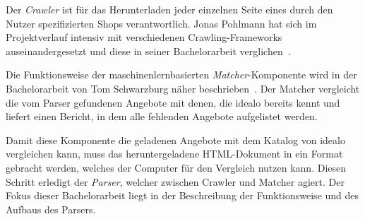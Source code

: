 Der \textit{Crawler} ist für das Herunterladen jeder einzelnen Seite eines durch den Nutzer spezifizierten Shops
verantwortlich.
Jonas Pohlmann hat sich im Projektverlauf intensiv mit verschiedenen Crawling-Frameworks auseinandergesetzt und diese
in seiner Bachelorarbeit verglichen~\cite{thesis:jonas}.

Die Funktionsweise der maschinenlernbasierten \textit{Matcher}-Komponente wird in der Bachelorarbeit von Tom
Schwarzburg näher beschrieben~\cite{thesis:tom}.
Der Matcher vergleicht die vom Parser gefundenen Angebote mit denen, die idealo bereits kennt und liefert
einen Bericht, in dem alle fehlenden Angebote aufgelistet werden.

Damit diese Komponente die geladenen Angebote mit dem Katalog von idealo vergleichen kann, muss das heruntergeladene
HTML-Dokument in ein Format gebracht werden, welches der Computer für den Vergleich nutzen kann.
Diesen Schritt erledigt der \textit{Parser}, welcher zwischen Crawler und Matcher agiert.
Der Fokus dieser Bachelorarbeit liegt in der Beschreibung der Funktionsweise und des Aufbaus des Parsers.